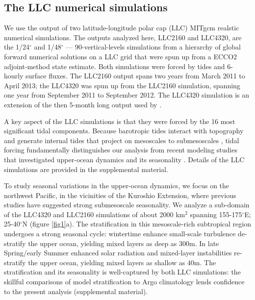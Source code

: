 \documentclass[grl]{agutex2015}
\begin{document}
\begin{article}
\section{The LLC numerical simulations}
We use the output of two latitude-longitude polar cap (LLC)
MITgcm realstic numerical simulations. The outputs
 analyzed here, LLC2160 and LLC4320,
are the 1/24$^\circ$ and 1/48$^\circ$  --- 90-vertical-levels simulations from
a hierarchy of global
forward numerical solutions on a LLC grid   \citep{forget_etal2015} that were
spun up from a ECCO2 adjoint-method state estimate. Both simulations were forced by
tides and 6-hourly surface fluxes. The LLC2160
output spans two years from March 2011 to April 2013; the LLC4320 was spun up from
the LLC2160 simulation, spanning one year from September 2011 to September 2012.
The LLC4320 simulation is an extension of the then 5-month long output used by
\citet{rocha_etal2016}.

A key aspect of the LLC simulations is that they were forced by
the 16 most significant tidal components.
Because barotropic tides interact with topography and generate internal
tides that project on mesoscales to submesoscales
\citep[e.g., ][]{rocha_etal2016}, tidal forcing fundamentally distinguishes our analysis
from recent modeling studies that investigated upper-ocean dynamics
and its seasonality \citep{sasaki_etal2014,qiu_etal2014}. Details of the LLC simulations
are provided in the supplemental material.

To study seasonal variations in the upper-ocean dynamics, we focus on the northwest
Pacific, in the vicinities of the Kuroshio
Extension, where previous studies have suggested strong submesoscale seasonality.
We analyze a sub-domain of the LLC4320 and LLC2160 simulations of about 2000 km$^2$
spanning 155-175$^\circ$E; 25-40$^\circ$N (figure \ref{fig1}a). The stratification
in this mesoscale-rich subtropical region undergoes a strong seasonal cycle: wintertime
enhance small-scale turbulence de-stratify the upper ocean, yielding mixed layers
as deep as 300m. In late Spring/early Summer enhanced solar radiation and mixed-layer
instabilities re-stratify the upper ocean, yielding mixed layers as shallow as 40m.
The stratification and its seasonality is well-captured by both LLC simulations:
the skillful comparisons of model stratification to Argo climatology lends confidence
to the present analysis (supplemental material).


\end{article}
\end{document}
